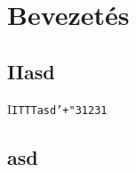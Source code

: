 \chapter{Bevezetés}

\section{IIasd}
\lipsum
\lipsum
I\texttt{ITTTasd'+"31231}
\section{asd}
\lipsum